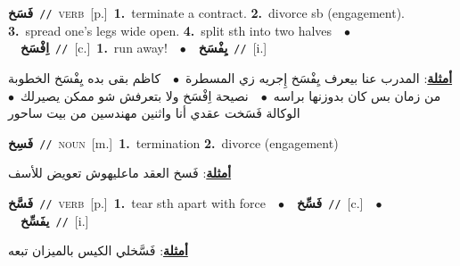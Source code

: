 \documentclass[10pt,a4paper,twoside]{article} %
\begin{document}
\begin{multicols}{2}
{\setlength\topsep{0pt}\textbf{\foreignlanguage{arabic}{فَسَخ}}\ {\color{gray}\texttt{//}\color{black}}\ \textsc{verb}\ [p.]\ \textbf{1.}~terminate a contract.  \textbf{2.}~divorce sb (engagement).  \textbf{3.}~spread one's legs wide open.  \textbf{4.}~split sth into two halves\ \ $\bullet$\ \ \setlength\topsep{0pt}\textbf{\foreignlanguage{arabic}{اِفْسَخ}}\ {\color{gray}\texttt{//}\color{black}}\ [c.]\ \textbf{1.}~run away!\ \ $\bullet$\ \ \setlength\topsep{0pt}\textbf{\foreignlanguage{arabic}{يِفْسَخ}}\ {\color{gray}\texttt{//}\color{black}}\ [i.]\  \begin{flushright}\color{gray}\foreignlanguage{arabic}{\textbf{\underline{\foreignlanguage{arabic}{أمثلة}}}: المدرب عنا بيعرف يِفْسَخ إِجريه زي المسطرة\ $\bullet$\ \  كاظم بقى بده يِفْسَخ الخطوبة من زمان بس كان بدوزنها براسه\ $\bullet$\ \  نصيحة اِفْسَخ ولا بتعرفش شو ممكن يصيرلك\ $\bullet$\ \  الوكالة فَسَخت عقدي أنا واثنين مهندسين من بيت ساحور}\end{flushright}\color{black}} \vspace{2mm}

{\setlength\topsep{0pt}\textbf{\foreignlanguage{arabic}{فَسِخ}}\ {\color{gray}\texttt{//}\color{black}}\ \textsc{noun}\ [m.]\ \textbf{1.}~termination  \textbf{2.}~divorce (engagement)\  \begin{flushright}\color{gray}\foreignlanguage{arabic}{\textbf{\underline{\foreignlanguage{arabic}{أمثلة}}}: فَسخ العقد ماعليهوش تعويض للأسف}\end{flushright}\color{black}} \vspace{2mm}

{\setlength\topsep{0pt}\textbf{\foreignlanguage{arabic}{فَسَّخ}}\ {\color{gray}\texttt{//}\color{black}}\ \textsc{verb}\ [p.]\ \textbf{1.}~tear sth apart with force\ \ $\bullet$\ \ \setlength\topsep{0pt}\textbf{\foreignlanguage{arabic}{فَسِّخ}}\ {\color{gray}\texttt{//}\color{black}}\ [c.]\ \ $\bullet$\ \ \setlength\topsep{0pt}\textbf{\foreignlanguage{arabic}{يفَسِّخ}}\ {\color{gray}\texttt{//}\color{black}}\ [i.]\  \begin{flushright}\color{gray}\foreignlanguage{arabic}{\textbf{\underline{\foreignlanguage{arabic}{أمثلة}}}: فَسَّخلي الكيس بالميزان تبعه}\end{flushright}\color{black}} \vspace{2mm}


\end{multicols}
\end{document}
